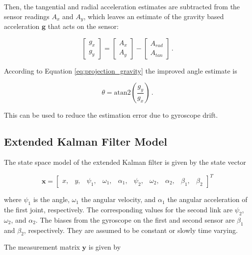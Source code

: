 Then, the tangential and radial acceleration estimates are subtracted from the sensor readings $A_x$ and $A_y$, which leaves an estimate of the gravity based acceleration $\mathbf{g}$ that acts on the sensor:

\begin{equation}
\begin{bmatrix}
    g_x \\
    g_y 
    \end{bmatrix} = 
    \begin{bmatrix}
    A_x \\
    A_y 
    \end{bmatrix} -
    \begin{bmatrix}
    A_{rad} \\
    A_{tan} 
    \end{bmatrix}\,.
\end{equation}

\noindent
According to Equation \ref{eq:projection_gravity} the improved angle estimate is

\begin{equation}
  \theta = \mbox{atan2}(\frac{g_y}{g_x})\,.
\end{equation}

\noindent
This can be used to reduce the estimation error due to gyroscope drift.

\subsection{Extended Kalman Filter Model}

The state space model of the extended Kalman filter is given by the state vector

\begin{equation} \label{eq:state_vector}
  \mathbf{x} = \begin{bmatrix}
  	x, & y, & \psi_1, & \omega_1, & \alpha_1, & \psi_2, & \omega_2, & \alpha_2, & \beta_1, & \beta_2
  \end{bmatrix}^T
\end{equation}

where $\psi_1$ is the angle, $\omega_1$ the angular velocity, and $\alpha_1$ the angular acceleration of the first joint, respectively. The corresponding values for the second link are $\psi_2$, $\omega_2$, and $\alpha_2$. The biases from the gyroscope on the first and second sensor are $\beta_1$ and $\beta_2$, respectively. They are assumed to be constant or slowly time varying.

The measurement matrix $\mathbf{y}$ is given by


